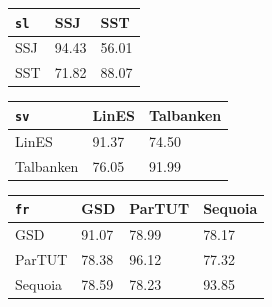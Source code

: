 \begin{table}[H]
\begin{minipage}{.5\linewidth}
\begin{tabular}{|l|l|l|}
    \hline
    \verb|sl| & SSJ & SST \\
    \hline
    SSJ & 94.43 & 56.01 \\
    \hline
    SST & 71.82 & 88.07 \\
    \hline
    \end{tabular}%
    \vspace{5mm}
    \begin{tabular}{|l|l|l|}
    \hline
    \verb|sv| & LinES & Talbanken \\
    \hline
    LinES & 91.37 & 74.50 \\
    \hline
    Talbanken & 76.05 & 91.99 \\
    \hline
    \end{tabular}%
    \vspace{5mm}
    \begin{tabular}{|l|l|l|l|}
    \hline
    \verb|fr| & GSD & ParTUT & Sequoia\\
    \hline
    GSD & 91.07 & 78.99 & 78.17 \\
    \hline
    ParTUT & 78.38 & 96.12 & 77.32 \\
    \hline
    Sequoia & 78.59 & 78.23 & 93.85 \\
    \hline
    \end{tabular}
    \end{minipage}%
\end{table}%
